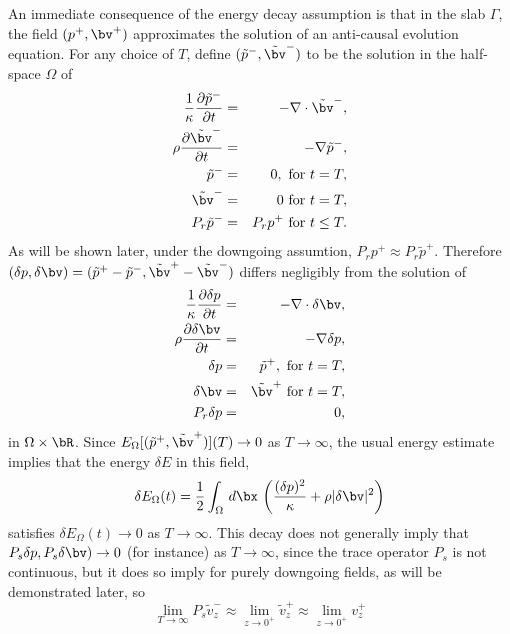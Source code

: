 An immediate consequence of the energy decay assumption is that in the
slab $\Gamma$, the field $(p^+,\bv^+)$ approximates the solution of an
anti-causal evolution equation. For any choice of $T$, define
$(\tilde{p}^-,\tilde{\bv}^-)$ to be the solution in the half-space
$\Omega$ of
\begin{eqnarray}
\label{eqn:revawe}
  \frac{1}{\kappa}\frac{\partial \tilde{p}^-}{\partial t} & = & - \nabla \cdot \tilde{\bv}^-, \nonumber \\
  \rho\frac{\partial \tilde{\bv}^-}{\partial t} & = & - \nabla \tilde{p}^-,\nonumber \\
  \tilde{p}^- & =& 0,  \mbox{ for } t=T,\nonumber\\ 
  \tilde{\bv}^- & = & 0 \mbox{ for } t=T,\nonumber\\
  P_r\tilde{p}^- &=& P_rp^+ \mbox { for } t \le T . 
\end{eqnarray}
As will be shown later, under the downgoing assumtion, $P_r p^+
\approx P_r \tilde{p}^+$.
Therefore $(\delta p,\delta \bv)=(\tilde{p}^+-\tilde{p}^-,\tilde{\bv}^+-\tilde{\bv}^-)$
differs negligibly from the solution of
\begin{eqnarray}
\label{eqn:deltaawe}
  \frac{1}{\kappa}\frac{\partial \delta p}{\partial t} & = & -
                                                               \nabla
                                                               \cdot
                                                               \delta \bv, \nonumber \\
  \rho\frac{\partial \delta \bv}{\partial t} & = & - \nabla \delta p,\nonumber \\
  \delta p & =& \tilde{p}^+,  \mbox{ for } t=T,\nonumber\\ 
  \delta \bv & = & \tilde{\bv}^+ \mbox{ for } t=T,\nonumber\\
  P_r\delta p & = & 0,
\end{eqnarray}
in $\Omega \times \bR$. Since
$E_{\Omega}[(\tilde{p}^+,\tilde{\bv}^+)](T) \rightarrow 0$ as $T
\rightarrow \infty$, the usual energy estimate implies that the energy $\delta
E$ in this field,
\[
  \delta E_{\Omega}(t) = \frac{1}{2} \int_{\Omega} \,d\bx \,
 \left(\frac{(\delta p)^2}{\kappa} + \rho |\delta \bv|^2\right)
\]
satisfies $\delta E_{\Omega}(t) \rightarrow 0$ as $T \rightarrow
\infty$. This decay does not generally imply that $P_s\delta p, P_s \delta \bv)
\rightarrow 0$ (for instance) as $T \rightarrow \infty$, since the trace operator
$P_s$ is not continuous, but it does so imply for purely downgoing
fields, as will be demonstrated later, so
\begin{equation}
  \label{eqn:approxinv0}
  \lim_{T \rightarrow \infty} P_s\tilde{v}_z^- \approx \lim_{z \rightarrow
    0^+}\tilde{v}_z^+ \approx \lim_{z \rightarrow 0^+}v^+_z
\end{equation}
  
